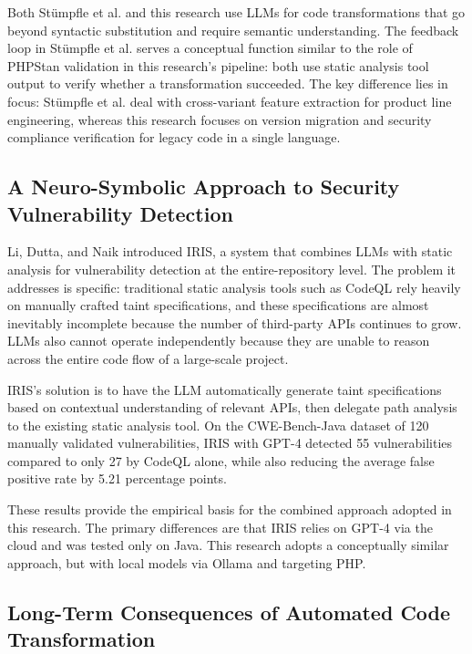 Both Stümpfle et al. and this research use LLMs for code transformations that go beyond syntactic substitution and require semantic understanding. The feedback loop in Stümpfle et al. serves a conceptual function similar to the role of PHPStan validation in this research's pipeline: both use static analysis tool output to verify whether a transformation succeeded. The key difference lies in focus: Stümpfle et al. deal with cross-variant feature extraction for product line engineering, whereas this research focuses on version migration and security compliance verification for legacy code in a single language.

\subsection{A Neuro-Symbolic Approach to Security Vulnerability Detection}

Li, Dutta, and Naik \cite{li2025iris} introduced IRIS, a system that combines LLMs with static analysis for vulnerability detection at the entire-repository level. The problem it addresses is specific: traditional static analysis tools such as CodeQL rely heavily on manually crafted taint specifications, and these specifications are almost inevitably incomplete because the number of third-party APIs continues to grow. LLMs also cannot operate independently because they are unable to reason across the entire code flow of a large-scale project.

IRIS's solution is to have the LLM automatically generate taint specifications based on contextual understanding of relevant APIs, then delegate path analysis to the existing static analysis tool. On the CWE-Bench-Java dataset of 120 manually validated vulnerabilities, IRIS with GPT-4 detected 55 vulnerabilities compared to only 27 by CodeQL alone, while also reducing the average false positive rate by 5.21 percentage points.

These results provide the empirical basis for the combined approach adopted in this research. The primary differences are that IRIS relies on GPT-4 via the cloud and was tested only on Java. This research adopts a conceptually similar approach, but with local models via Ollama and targeting PHP.

\subsection{Long-Term Consequences of Automated Code Transformation}

